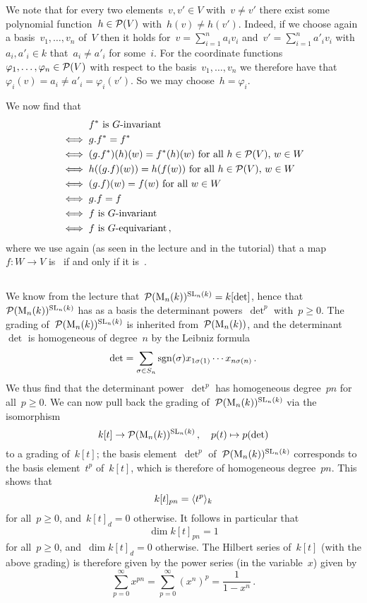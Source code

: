 We note that for every two elements~$v, v' \in V$ with~$v \neq v'$ there exist some polynomial function~$h \in \mathcal{P}(V)$ with~$h(v) \neq h(v')$.
Indeed, if we choose again a basis~$v_1, \dotsc, v_n$ of~$V$ then it holds for~$v = \sum_{i=1}^n a_i v_i$ and~$v' = \sum_{i=1}^n a'_i v_i$ with~$a_i, a'_i \in k$ that~$a_i \neq a'_i$ for some~$i$.
For the coordinate functions~$\varphi_1, \dotsc, \varphi_n \in \mathcal{P}(V)$ with respect to the basis~$v_1, \dotsc, v_n$ we therefore have that~$\varphi_i(v) = a_i \neq a'_i = \varphi_i(v')$.
So we may choose~$h = \varphi_i$.

We now find that
\begin{align*}
      {}& \text{$f^*$ is~\dash{$G$}{invariant}} \\
  \iff{}& g.f^* = f^* \\
  \iff{}& \text{$(g.f^*)(h)(w) = f^*(h)(w)$ for all~$h \in \Pol(V)$,~$w \in W$} \\
  \iff{}& \text{$h((g.f)(w)) = h(f(w))$ for all~$h \in \Pol(V)$,~$w \in W$}  \\
  \iff{}& \text{$(g.f)(w) = f(w)$ for all~$w \in W$}  \\
  \iff{}& g.f = f \\
  \iff{}& \text{$f$ is~\dash{$G$}{invariant}} \\
  \iff{}& \text{$f$ is~\dash{$G$}{equivariant}} \,,
\end{align*}
where we use again (as seen in the lecture and in the tutorial) that a map~$f \colon W \to V$ is~ if and only if it is~.





\subsection{}

We know from the lecture that~$\mathcal{P}(\operatorname{M}_{n}(k))^{\operatorname{SL}_n(k)} = k[\det]$, hence that~$\mathcal{P}(\operatorname{M}_{n}(k))^{\operatorname{SL}_n(k)}$ has as a basis the determinant powers~$\det^p$ with~$p \geq 0$.
The grading of~$\mathcal{P}(\operatorname{M}_{n}(k))^{\operatorname{SL}_n(k)}$ is inherited from~$\mathcal{P}(\operatorname{M}_{n}(k))$, and the determinant~$\det$ is homogeneous of degree~$n$ by the Leibniz formula
\[
    \det
  = \sum_{\sigma \in S_n} \operatorname{sgn}(\sigma) x_{1\sigma(1)} \dotsm x_{n\sigma(n)} \,.
\]
We thus find that the determinant power~$\det^p$ has homogeneous degree~$pn$ for all~$p \geq 0$.
We can now pull back the grading of~$\mathcal{P}(\operatorname{M}_{n}(k))^{\operatorname{SL}_n(k)}$ via the isomorphism
\[
          k[t]
  \to     \mathcal{P}(\operatorname{M}_{n}(k))^{\operatorname{SL}_n(k)} \,,
  \quad   p(t)
  \mapsto p(\det)
\]
to a grading of~$k[t]$;
the basis element~$\det^p$ of~$\mathcal{P}(\operatorname{M}_{n}(k))^{\operatorname{SL}_n(k)}$ corresponds to the basis element~$t^p$ of~$k[t]$, which is therefore of homogeneous degree~$pn$.
This shows that
\[
    k[t]_{pn}
  = \langle t^p \rangle_k
\]
for all~$p \geq 0$, and~$k[t]_d = 0$ otherwise.
It follows in particular that
\[
    \dim k[t]_{pn}
  = 1
\]
for all~$p \geq 0$, and~$\dim k[t]_d = 0$ otherwise.
The Hilbert series of~$k[t]$ (with the above grading) is therefore given by the power series (in the variable~$x$) given by
\[
    \sum_{p=0}^\infty x^{pn}
  = \sum_{p=0}^\infty (x^n)^p
  = \frac{1}{1-x^n} \,.
\]
